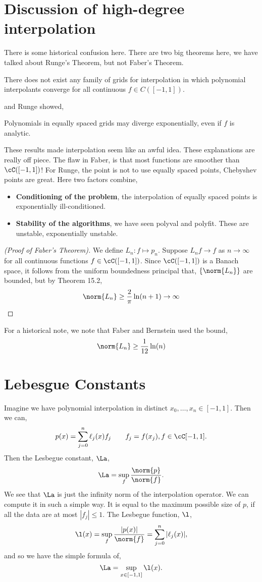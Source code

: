 
\section{Discussion of high-degree interpolation}
There is some historical confusion here. There are two big theorems here, we have talked about Runge's Theorem, but not Faber's Theorem.
\begin{nthm}[Faber, 1914]
  There does not exist any family of grids for interpolation in which polynomial interpolants converge for all continuous $f \in C([-1, 1])$.
\end{nthm}
\noindent
and Runge showed,
\begin{nthm}[Runge, 1901]
  Polynomials in equally spaced grids may diverge exponentially, even if $f$ is analytic.
\end{nthm}
\noindent
These results made interpolation seem like an awful idea. These explanations are really off piece. The flaw in Faber, is that most functions are smoother than $\cC([-1, 1])$! For Runge, the point is not to use equally spaced points, Chebyshev points are great. Here two factors combine,
\begin{itemize}
  \item \textbf{Conditioning of the problem}, the interpolation of equally spaced points is exponentially ill-conditioned.
  \item \textbf{Stability of the algorithms}, we have seen polyval and polyfit. These are unstable, exponentially unstable.
\end{itemize}
\noindent
\begin{proof}[(Proof of Faber's Theorem)]
  We define $L_n : f \mapsto p_n$. Suppose $L_n f \to f$ as $n \to \infty$ for all continuous functions $f \in \cC([-1, 1])$. Since $\cC([-1, 1])$ is a Banach space, it follows from the uniform boundedness principal that, $\{\norm{L_n}\}$ are bounded, but by Theorem 15.2,
  $$ \norm{L_n} \ge \frac{2}{\pi}\ln (n+1) \to \infty $$
\end{proof}

\noindent
For a historical note, we note that Faber and Bernstein used the bound,
$$ \norm{L_n} \ge \frac{1}{12}\ln (n) $$

\section{Lebesgue Constants}
Imagine we have polynomial interpolation in distinct $x_0, \dots, x_n \in [-1, 1]$. Then we can,
$$ p(x) = \sum_{j=0}^n \ell_j(x)f_j \qquad f_j = f(x_j), f \in \cC[-1, 1]. $$
Then the Lesbegue constant, $\La$,
$$ \La = \sup_f \frac{\norm{p}}{\norm{f}}. $$
We see that $\La$ is just the infinity norm of the interpolation operator. We can compute it in such a simple way. It is equal to the maximum possible size of $p$, if all the data are at most $|f_j| \le 1$. The Lesbegue function, $\l$,
$$ \l(x) = \sup_f \frac{|p(x)|}{\norm{f}} = \sum_{j=0}^n |\ell_j(x)|, $$
and so we have the simple formula of,
$$ \La = \sup_{x \in [-1, 1]} \l(x). $$

